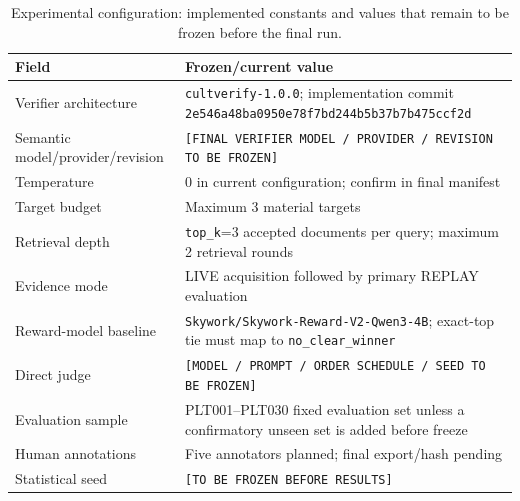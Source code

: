 \begin{table}[htbp]
\centering
\footnotesize
\setlength{\tabcolsep}{4pt}
\renewcommand{\arraystretch}{1.08}
\caption{Experimental configuration: implemented constants and values that remain to be frozen before the final run.}
\label{tab:experiment-freeze}
\begin{tabularx}{\textwidth}{p{4.2cm}X}
\toprule
\textbf{Field} & \textbf{Frozen/current value} \\
\midrule
Verifier architecture & \texttt{cultverify-1.0.0}; implementation commit \texttt{2e546a48ba0950e78f7bd244b5b37b7b475ccf2d} \\
Semantic model/provider/revision & \texttt{[FINAL VERIFIER MODEL / PROVIDER / REVISION TO BE FROZEN]} \\
Temperature & 0 in current configuration; confirm in final manifest \\
Target budget & Maximum 3 material targets \\
Retrieval depth & \texttt{top\_k}=3 accepted documents per query; maximum 2 retrieval rounds \\
Evidence mode & LIVE acquisition followed by primary REPLAY evaluation \\
Reward-model baseline & \texttt{Skywork/Skywork-Reward-V2-Qwen3-4B}; exact-top tie must map to \texttt{no\_clear\_winner} \\
Direct judge & \texttt{[MODEL / PROMPT / ORDER SCHEDULE / SEED TO BE FROZEN]} \\
Evaluation sample & PLT001--PLT030 fixed evaluation set unless a confirmatory unseen set is added before freeze \\
Human annotations & Five annotators planned; final export/hash pending \\
Statistical seed & \texttt{[TO BE FROZEN BEFORE RESULTS]} \\
\bottomrule
\end{tabularx}
\end{table}
